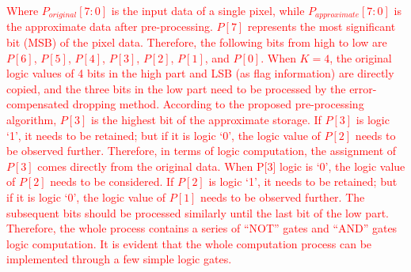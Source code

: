 \documentclass[lettersize,journal]{IEEEtran}
\begin{document}





\textcolor{red}{Where $P_{original}[7 : 0]$ is the input data of a single pixel, while $P_{approximate}[7 : 0]$ is the approximate data after pre-processing. $P[7]$ represents the most significant bit (MSB) of the pixel data. Therefore, the following bits from high to low are $P[6]$, $P[5]$, $P[4]$, $P[3]$, $P[2]$, $P[1]$, and $P[0]$. When $K=4$, the original logic values of 4 bits in the high part and LSB (as flag information) are directly copied, and the three bits in the low part need to be processed by the error-compensated dropping method. According to the proposed pre-processing algorithm, $P[3]$ is the highest bit of the approximate storage. If $P[3]$ is logic `1', it needs to be retained; but if it is logic `0', the logic value of $P[2]$ needs to be observed further. Therefore, in terms of logic computation, the assignment of $P[3]$ comes directly from the original data. When P[3] logic is `0', the logic value of $P[2]$ needs to be considered. If $P[2]$ is logic `1', it needs to be retained; but if it is logic `0', the logic value of $P[1]$ needs to be observed further. The subsequent bits should be processed similarly until the last bit of the low part. Therefore, the whole process contains a series of ``NOT'' gates and ``AND'' gates logic computation. It is evident that the whole computation process can be implemented through a few simple logic gates.} 
\end{document}
